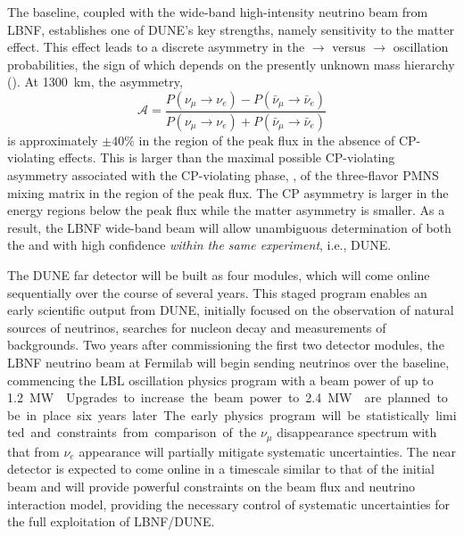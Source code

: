 The  baseline, coupled with the wide-band
high-intensity neutrino beam from LBNF, establishes one of DUNE's key
strengths, namely sensitivity to the matter effect. This effect leads to a
discrete asymmetry in the \numu $\to$ \nue versus \anumu $\to$ \anue
oscillation probabilities, the sign of which depends on the presently
unknown mass hierarchy ().  At \SI{1300}{\km}, the asymmetry,
\begin{equation}
\mathcal{A} = \frac{ P(\nu_\mu \rightarrow \nu_e)-P(\bar{\nu}_\mu \rightarrow \bar{\nu}_e)}{P(\nu_\mu \rightarrow \nu_e)+P(\bar{\nu}_\mu \rightarrow \bar{\nu}_e)}
\end{equation}
is approximately $\pm 40\%$ in the region of the peak flux in the
absence of CP-violating effects. This is larger than the maximal
possible CP-violating asymmetry associated with the CP-violating
phase, \deltacp, of the three-flavor PMNS mixing matrix in the region of
the peak flux. The CP asymmetry is larger in the energy regions below the peak
flux while the matter asymmetry is smaller. As a result, the LBNF
wide-band beam will allow unambiguous determination of both the  and
\deltacp with high confidence \textit{within the same experiment}, i.e., DUNE.   

The DUNE far detector will be built as four  modules, which will
come online sequentially over the course of several years. 
This staged program enables an early scientific output from DUNE, 
initially focused on the observation of natural
sources of neutrinos, searches for nucleon decay and 
measurements of backgrounds. 
Two years after commissioning the first two detector modules, 
the LBNF neutrino
beam at Fermilab will  
begin sending neutrinos over the 
baseline, commencing the LBL oscillation physics program with a beam power of up to \SI{1.2}\MW{}. Upgrades to increase the beam power to \SI{2.4}\MW{} are planned to be in place six years later.
The early physics program
will be statistically limited and constraints from comparison of the $\nu_\mu$
disappearance spectrum with that from $\nu_e$ appearance will partially mitigate systematic uncertainties. The near detector is expected to come online in a timescale similar to that of the initial beam and will provide powerful constraints on the beam flux and neutrino interaction model, providing the
necessary control of systematic uncertainties for the full exploitation of LBNF/DUNE. 


